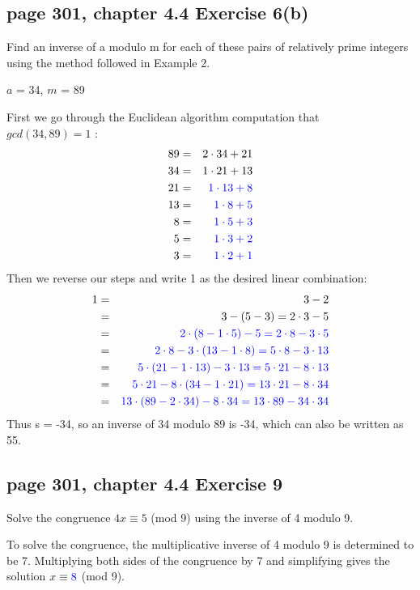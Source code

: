 \documentclass[sigconf]{acmart}
\newcommand{\answer}[2]{%
  \if\relax\detokenize{#2}\relax
    \underline{\mbox{請作答}}%
  \else
    \textcolor{blue}{#2}%
  \fi
}
\begin{document}
\subsection{page 301, chapter 4.4 Exercise 6(b)}
\begin{shaded}
    Find an inverse of a modulo m for each of these pairs of relatively prime integers using the method followed in Example 2.
    \begin{center}
        $a$ = 34, $m$ = 89
    \end{center}
\end{shaded}  
First we go through the Euclidean algorithm computation that\\
$gcd(34, 89) = 1$ :
\begin{eqnarray*}
    89 & = & 2 \cdot 34 + 21 \\
    34 & = & 1 \cdot 21 + 13  \\
    21 & = & \answer{4.4.6a}{1 \cdot 13 + 8}\\
    13 & = & \answer{4.4.6b}{1 \cdot 8 + 5}\\
     8 & = & \answer{4.4.6c}{1 \cdot 5 + 3}\\
     5 & = & \answer{4.4.6d}{1 \cdot 3 + 2}\\
     3 & = & \answer{4.4.6e}{1 \cdot 2 + 1}
\end{eqnarray*}
Then we reverse our steps and write 1 as the desired linear combination:
\begin{eqnarray*}
    1 & = & 3 - 2 \\
    ~ & = & 3 - (5 - 3) = 2 \cdot 3 - 5  \\
    ~ & = & \answer{4.4.6f}{2 \cdot (8 - 1 \cdot 5) - 5 = 2 \cdot 8 - 3 \cdot 5}\\
    ~ & = & \answer{4.4.6g}{2 \cdot 8 - 3 \cdot (13 - 1 \cdot 8) = 5 \cdot 8 - 3 \cdot 13}\\
    ~ & = & \answer{4.4.6h}{5 \cdot (21 - 1 \cdot 13) - 3 \cdot 13 = 5 \cdot 21 - 8 \cdot 13}\\
    ~ & = & \answer{4.4.6i}{5 \cdot 21 - 8 \cdot (34 - 1 \cdot 21) = 13 \cdot 21 - 8 \cdot 34}\\
    ~ & = & \answer{4.4.6j}{13 \cdot (89 - 2 \cdot 34) - 8\cdot 34 = 13 \cdot 89 - 34 \cdot 34}\\
\end{eqnarray*}
Thus s = -34, so an inverse of 34 modulo 89 is -34, which can also be written as 55.

\subsection{page 301, chapter 4.4 Exercise 9}
\begin{shaded}
    Solve the congruence $4x \equiv 5$ (mod 9) using the inverse of 4
modulo 9.
\end{shaded}  
To solve the congruence, the multiplicative inverse of 4 modulo 9 is determined to be 7.
Multiplying both sides of the congruence by 7 and simplifying gives the solution $x \equiv \answer{4.4.9a}{8}$ (mod 9).
\end{document}
